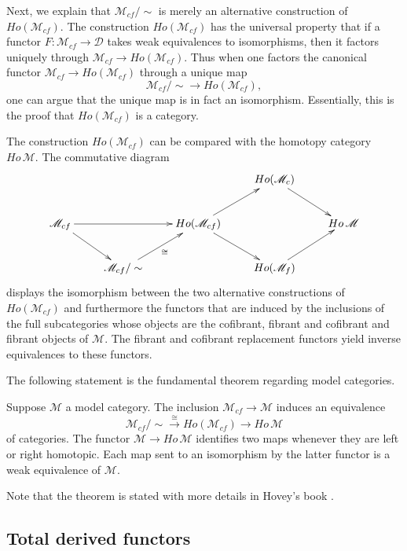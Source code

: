 Next, we explain that $\mathscr{M} _{cf}/\sim$ is merely an alternative construction of $Ho(\mathscr{M} _{cf})$. The construction $Ho(\mathscr{M} _{cf})$ has the universal property that if a functor $F:\mathscr{M} _{cf}\to \mathscr{D}$ takes weak equivalences to isomorphisms, then it factors uniquely through $\mathscr{M} _{cf}\to Ho(\mathscr{M} _{cf})$. Thus when one factors the canonical functor $\mathscr{M} _{cf} \to Ho(\mathscr{M} _{cf})$ through a unique map
\[\mathscr{M} _{cf}/\sim \to Ho(\mathscr{M} _{cf}),\]
one can argue that the unique map is in fact an isomorphism. Essentially, this is the proof that $Ho(\mathscr{M} _{cf})$ is a category.

The construction $Ho(\mathscr{M} _{cf})$ can be compared with the homotopy category $Ho\, \mathscr{M}$. The commutative diagram 
\begin{displaymath}
\xymatrix{
&&& Ho(\mathscr{M} _c) \ar[dr] \\
\mathscr{M} _{cf} \ar[dr] \ar[rr] && Ho(\mathscr{M} _{cf}) \ar[ur] \ar[dr] && Ho\, \mathscr{M} \\
& \mathscr{M} _{cf}/\sim \ar[ur]_\cong && Ho(\mathscr{M} _f) \ar[ur]
}
\end{displaymath}
displays the isomorphism between the two alternative constructions of $Ho(\mathscr{M} _{cf})$ and furthermore the functors that are induced by the inclusions of the full subcategories whose objects are the cofibrant, fibrant and cofibrant and fibrant objects of $\mathscr{M}$. The fibrant and cofibrant replacement functors yield inverse equivalences to these functors.

The following statement is the fundamental theorem regarding model categories.
\begin{theorem}
Suppose $\mathscr{M}$ a model category. The inclusion $\mathscr{M} _{cf}\to \mathscr{M}$ induces an equivalence
\[\mathscr{M} _{cf}/\sim \xrightarrow{\cong } Ho(\mathscr{M} _{cf})\to Ho\, \mathscr{M}\]
of categories. The functor $\mathscr{M} \to Ho\, \mathscr{M}$ identifies two maps whenever they are left or right homotopic. Each map sent to an isomorphism by the latter functor is a weak equivalence of $\mathscr{M}$.
\end{theorem}
\noindent Note that the theorem is stated with more details in Hovey's book \cite[Thm.~1.2.10, p.~13]{Ho99}.




\subsection{Total derived functors}

